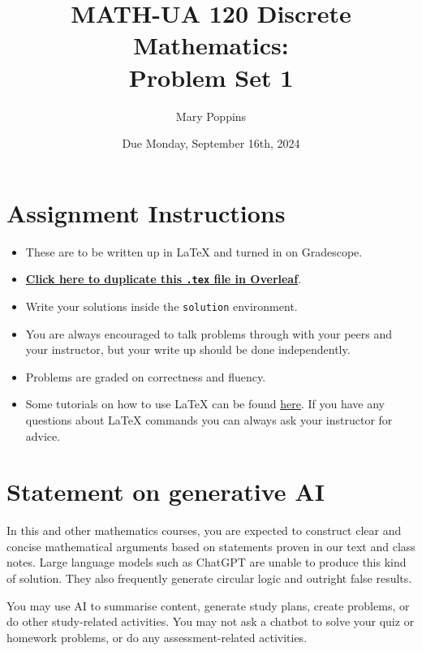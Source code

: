 \documentclass{article}
\title{\textbf{MATH-UA 120 Discrete Mathematics: \\ Problem Set 1}}
\author{%
    Mary Poppins %
}
\date{Due Monday, September 16th, 2024} %
\theoremstyle{definition}
\begin{document}
\maketitle %

\vfill

\section*{Assignment Instructions}

\begin{itemize}
    \item These are to be written up in \LaTeX{} and turned in on Gradescope.
    \item \href{https://bit.ly/4d4g2BH}{\textbf{Click here to duplicate this \texttt{.tex} file in Overleaf}}.
    \item Write your solutions inside the \texttt{solution} environment.
    \item You are always encouraged to talk problems through with your peers and your instructor, but your write up should be done independently.
    \item Problems are graded on correctness and fluency.
    \item Some tutorials on how to use \LaTeX{} can be found \href{https://www.overleaf.com/learn/latex/Tutorials}{\underline{here}}. If you have any questions about \LaTeX{} commands you can always ask your instructor for advice.
\end{itemize}

\vfill

\section*{Statement on generative AI}

In this and other mathematics courses, you are expected to construct clear and concise mathematical arguments based on statements proven in our text and class notes. Large language models such as ChatGPT are unable to produce this kind of solution. They also frequently generate circular logic and outright false results.
 
You may use AI to summarise content, generate study plans, create problems, or do other study-related activities. You may not ask a chatbot to solve your quiz or homework problems, or do any assessment-related activities.
 
\end{document}
